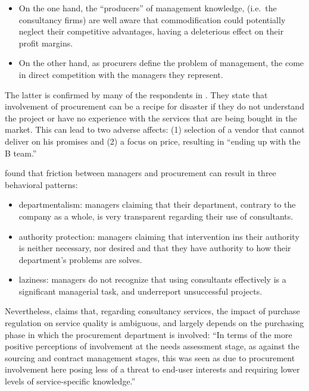 \documentclass[12pt]{article}
\begin{document}
\begin{itemize}
\item
  On the one hand, the ``producers'' of management knowledge, (i.e.~the
  consultancy firms) are well aware that commodification could
  potentially neglect their competitive advantages, having a deleterious
  effect on their profit margins.
\item
  On the other hand, as procurers define the problem of management, the
  come in direct competition with the managers they represent.
\end{itemize}

The latter is confirmed by many of the respondents in
\citet[161-163]{lonsdale2017}. They state that involvement of
procurement can be a recipe for disaster if they do not understand the
project or have no experience with the services that are being bought in
the market. This can lead to two adverse affects: (1) selection of a
vendor that cannot deliver on his promises and (2) a focus on price,
resulting in ``ending up with the B team.''

\citet[305-306]{honer2006} found that friction between managers and
procurement can result in three behavioral patterns:

\begin{itemize}
\item
  departmentalism: managers claiming that their department, contrary to
  the company as a whole, is very transparent regarding their use of
  consultants.
\item
  authority protection: managers claiming that intervention ins their
  authority is neither necessary, nor desired and that they have
  authority to how their department's problems are solves.
\item
  laziness: managers do not recognize that using consultants effectively
  is a significant managerial task, and underreport unsuccessful
  projects.
\end{itemize}

Nevertheless, \citet[164]{lonsdale2017} claims that, regarding
consultancy services, the impact of purchase regulation on service
quality is ambiguous, and largely depends on the purchasing phase in
which the procurement department is involved: ``In terms of the more
positive perceptions of involvement at the needs assessment stage, as
against the sourcing and contract management stages, this was seen as
due to procurement involvement here posing less of a threat to end-user
interests and requiring lower levels of service-specific knowledge.''
\end{document}
